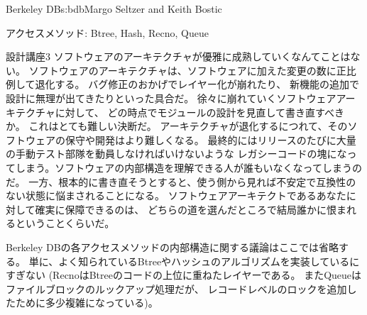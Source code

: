\begin{aosachapter}{Berkeley DB}{s:bdb}{Margo Seltzer and Keith Bostic}
\begin{aosasect1}{アクセスメソッド: Btree, Hash, Recno, Queue}
\begin{aosabox}{設計講座3}
ソフトウェアのアーキテクチャが優雅に成熟していくなんてことはない。
ソフトウェアのアーキテクチャは、ソフトウェアに加えた変更の数に正比例して退化する。
バグ修正のおかげでレイヤー化が崩れたり、
新機能の追加で設計に無理が出てきたりといった具合だ。
徐々に崩れていくソフトウェアアーキテクチャに対して、
どの時点でモジュールの設計を見直して書き直すべきか。
これはとても難しい決断だ。
アーキテクチャが退化するにつれて、そのソフトウェアの保守や開発はより難しくなる。
最終的にはリリースのたびに大量の手動テスト部隊を動員しなければいけないような
レガシーコードの塊になってしまう。ソフトウェアの内部構造を理解できる人が誰もいなくなってしまうのだ。
一方、根本的に書き直そうとすると、使う側から見れば不安定で互換性のない状態に悩まされることになる。
ソフトウェアアーキテクトであるあなたに対して確実に保障できるのは、
どちらの道を選んだところで結局誰かに恨まれるということくらいだ。

\end{aosabox}

Berkeley DBの各アクセスメソッドの内部構造に関する議論はここでは省略する。
単に、よく知られているBtreeやハッシュのアルゴリズムを実装しているにすぎない
(RecnoはBtreeのコードの上位に重ねたレイヤーである。
またQueueはファイルブロックのルックアップ処理だが、
レコードレベルのロックを追加したために多少複雑になっている)。

\end{aosasect1}


\end{aosachapter}
